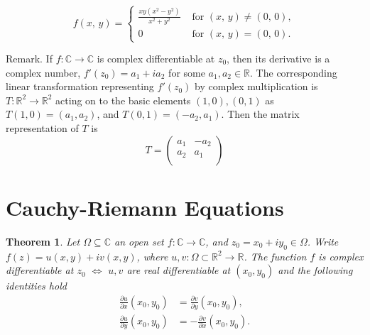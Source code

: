 \documentclass{amsart}
\newtheorem{thm}{Theorem}
\begin{document}
\[{\displaystyle f(x,\,y)={\begin{cases}{\frac {xy\left(x^{2}-y^{2}\right)}{x^{2}+y^{2}}}&{\mbox{ for }}(x,\,y)\neq (0,\,0),\\0&{\mbox{ for }}(x,\,y)=(0,\,0).\end{cases}}}\]


\alert{Remark}. If \(f:\mathbb{C}\to \mathbb{C}\) is complex differentiable at \(z_0\), then its derivative is a complex number, \(f'(z_0) = a_1 + i a_2\) for some \(a_1,a_2\in \mathbb{R}\).
The corresponding linear transformation representing \(f'(z_0)\) by complex multiplication is \(T:\mathbb{R}^2 \to \mathbb{R}^2\)  acting on to the basic elements \((1,0),(0,1)\) as
\(T(1,0) = (a_1 , a_2)\), and \(T(0,1) = (-a_2 , a_1)\). Then the matrix representation of \(T\) is
\[ T = \left( \begin{array}{cc}
a_{1} & -a_{2}\\
a_{2} &  a_{1}\\
\end{array} \right)
\]



\section{Cauchy-Riemann Equations}
\label{sec:org1d13145}

\begin{thm}
Let \(\Omega\subseteq \mathbb{C}\) an open set \(f:\mathbb{C} \to \mathbb{C}\), and \(z_0= x_0 + iy_0 \in \Omega\). Write \(f(z) = u(x,y) + i v(x,y)\), where \(u,v:\Omega\subset \mathbb{R}^2 \to \mathbb{R}\).
The function \(f\) is complex differentiable at \(z_0\) \(\Leftrightarrow\) \(u,v\) are real differentiable at \((x_0,y_0)\) and the following identities hold
\begin{equation}
\begin{split}
\frac{\partial u}{\partial x} (x_0,y_0) & = \frac{\partial v}{\partial y} (x_0,y_0), \\
\frac{\partial u}{\partial y} (x_0,y_0) & =- \frac{\partial v}{\partial x} (x_0,y_0).
\end{split}
\end{equation}
\end{thm}
\end{document}
